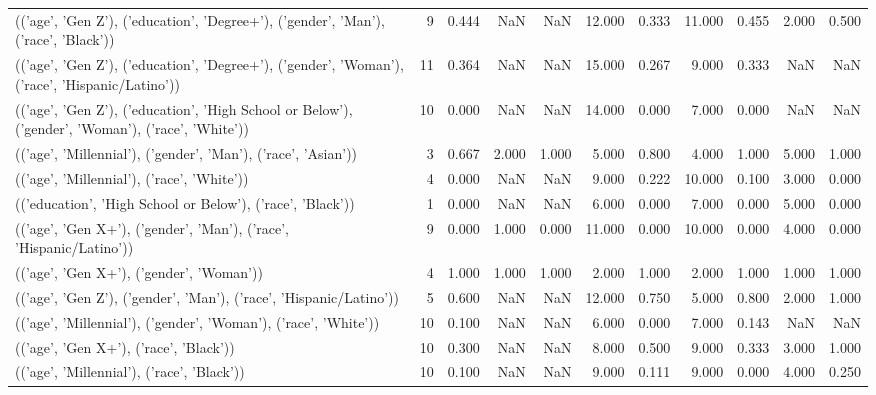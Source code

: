 \begin{tabular}{lrrrrrrrrrr}
(('age', 'Gen Z'), ('education', 'Degree+'), ('gender', 'Man'), ('race', 'Black')) & 9 & 0.444 & NaN & NaN & 12.000 & 0.333 & 11.000 & 0.455 & 2.000 & 0.500 \\
(('age', 'Gen Z'), ('education', 'Degree+'), ('gender', 'Woman'), ('race', 'Hispanic/Latino')) & 11 & 0.364 & NaN & NaN & 15.000 & 0.267 & 9.000 & 0.333 & NaN & NaN \\
(('age', 'Gen Z'), ('education', 'High School or Below'), ('gender', 'Woman'), ('race', 'White')) & 10 & 0.000 & NaN & NaN & 14.000 & 0.000 & 7.000 & 0.000 & NaN & NaN \\
(('age', 'Millennial'), ('gender', 'Man'), ('race', 'Asian')) & 3 & 0.667 & 2.000 & 1.000 & 5.000 & 0.800 & 4.000 & 1.000 & 5.000 & 1.000 \\
(('age', 'Millennial'), ('race', 'White')) & 4 & 0.000 & NaN & NaN & 9.000 & 0.222 & 10.000 & 0.100 & 3.000 & 0.000 \\
(('education', 'High School or Below'), ('race', 'Black')) & 1 & 0.000 & NaN & NaN & 6.000 & 0.000 & 7.000 & 0.000 & 5.000 & 0.000 \\
(('age', 'Gen X+'), ('gender', 'Man'), ('race', 'Hispanic/Latino')) & 9 & 0.000 & 1.000 & 0.000 & 11.000 & 0.000 & 10.000 & 0.000 & 4.000 & 0.000 \\
(('age', 'Gen X+'), ('gender', 'Woman')) & 4 & 1.000 & 1.000 & 1.000 & 2.000 & 1.000 & 2.000 & 1.000 & 1.000 & 1.000 \\
(('age', 'Gen Z'), ('gender', 'Man'), ('race', 'Hispanic/Latino')) & 5 & 0.600 & NaN & NaN & 12.000 & 0.750 & 5.000 & 0.800 & 2.000 & 1.000 \\
(('age', 'Millennial'), ('gender', 'Woman'), ('race', 'White')) & 10 & 0.100 & NaN & NaN & 6.000 & 0.000 & 7.000 & 0.143 & NaN & NaN \\
(('age', 'Gen X+'), ('race', 'Black')) & 10 & 0.300 & NaN & NaN & 8.000 & 0.500 & 9.000 & 0.333 & 3.000 & 1.000 \\
(('age', 'Millennial'), ('race', 'Black')) & 10 & 0.100 & NaN & NaN & 9.000 & 0.111 & 9.000 & 0.000 & 4.000 & 0.250 \\
\bottomrule
\end{tabular}
